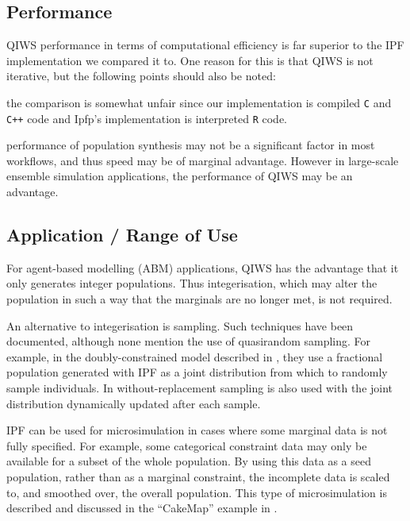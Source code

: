\documentclass{JASSS}
\begin{document}
\subsection{Performance}\label{performance-1}

QIWS performance in terms of computational efficiency is far superior to the IPF implementation we compared it to. One reason for this is that QIWS is not iterative, but the following points should also be noted:

\begin{itemize*}
\item
  the comparison is somewhat unfair since our implementation is compiled
  \texttt{C} and \texttt{C++} code and Ipfp's implementation is
  interpreted \texttt{R} code.
\item
  performance of population synthesis may not be a significant factor in
  most workflows, and thus speed may be of marginal advantage. However
  in large-scale ensemble simulation applications, the performance of
  QIWS may be an advantage.
\end{itemize*}

\subsection{Application / Range of Use}\label{application-range-of-use}

For agent-based modelling (ABM) applications, QIWS has the advantage
that it only generates integer populations. Thus integerisation, which
may alter the population in such a way that the marginals are no longer
met, is not required.

An alternative to integerisation is sampling. Such techniques have been documented, although none mention the use of quasirandom sampling. For example, in the doubly-constrained model described in \cite{lenormand_systematic_2016}, they use a fractional population generated with IPF as a joint distribution from which to randomly sample individuals. In \cite{gargiulo_commuting_2012} without-replacement sampling is also used with the joint distribution dynamically updated after each sample.

IPF can be used for microsimulation in cases where some marginal data is
not fully specified. For example, some categorical constraint data may
only be available for a subset of the whole population. By using this
data as a seed population, rather than as a marginal
constraint, the incomplete data is scaled to, and smoothed over, the
overall population. This type of microsimulation
is described and discussed in the ``CakeMap'' example in \cite{lovelace_spatial_2016}.
\end{document}
